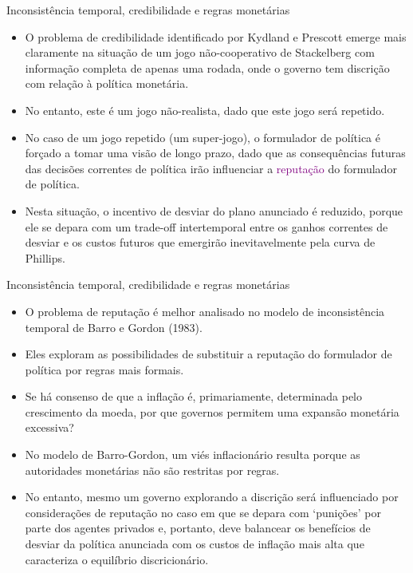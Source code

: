 \documentclass[10pt]{beamer}
\begin{document}
\begin{frame}{Inconsistência temporal, credibilidade e regras monetárias}
    \begin{itemize}
        \item O problema de credibilidade identificado por Kydland e Prescott emerge mais claramente na situação de um jogo não-cooperativo de Stackelberg com informação completa de apenas uma rodada, onde o governo tem discrição com relação à política monetária.
        \bigskip
        \item No entanto, este é um jogo não-realista, dado que este jogo será repetido.
        \bigskip
        \item No caso de um jogo repetido (um super-jogo), o formulador de política é forçado a tomar uma visão de longo prazo, dado que as consequências futuras das decisões correntes de política irão influenciar a \textcolor{purple}{reputação} do formulador de política.
        \bigskip
        \item Nesta situação, o incentivo de desviar do plano anunciado é reduzido, porque ele se depara com um trade-off intertemporal entre os ganhos correntes de desviar e os custos futuros que emergirão inevitavelmente pela curva de Phillips.
    \end{itemize}
\end{frame}

\begin{frame}{Inconsistência temporal, credibilidade e regras monetárias}
    \begin{itemize}
        \item O problema de reputação é melhor analisado no modelo de inconsistência temporal de Barro e Gordon (1983).
        \bigskip
        \item Eles exploram as possibilidades de substituir a reputação do formulador de política por regras mais formais.
        \bigskip
        \item Se há consenso de que a inflação é, primariamente, determinada pelo crescimento da moeda, por que governos permitem uma expansão monetária excessiva?
        \bigskip
        \item No modelo de Barro-Gordon, um viés inflacionário resulta porque as autoridades monetárias não são restritas por regras.
        \bigskip
        \item No entanto, mesmo um governo explorando a discrição será influenciado por considerações de reputação no caso em que se depara com `punições' por parte dos agentes privados e, portanto, deve balancear os benefícios de desviar da política anunciada com os custos de inflação mais alta que caracteriza o equilíbrio discricionário.
    \end{itemize}
\end{frame}
\end{document}
